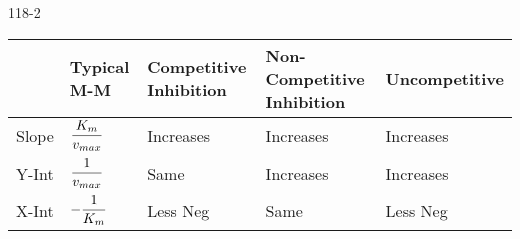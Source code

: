 \begin{mitframe}{118-2}
        
        
\begin{center}
\begin{tabular}
	{| >{\centering\arraybackslash}m{1.5cm} | >{\centering\arraybackslash}m{2cm} | >{\centering\arraybackslash}m{2cm} | >{\centering\arraybackslash}m{2cm} |>{\centering\arraybackslash}m{2cm} |}
\hline 
 
     &%
    Typical M-M &%
    Competitive Inhibition &%
    Non-Competitive Inhibition &%
    Uncompetitive \\ \hline
       
    Slope &%
    $\dfrac{\dilfac_{\mass}}{\vvel_{max}}$ &%
    Increases &%
    Increases &%
	Increases \\ \hline

    Y-Int &%
    $\dfrac{1}{\vvel_{max}}$ &%
	Same &%
    Increases &%
	Increases \\ \hline
    
    X-Int &%
	$-\dfrac{1}{\dilfac_{\mass}}$ &%
    Less Neg &%
    Same &%
	Less Neg \\ \hline
    
    
\end{tabular}
\end{center}
\end{mitframe}